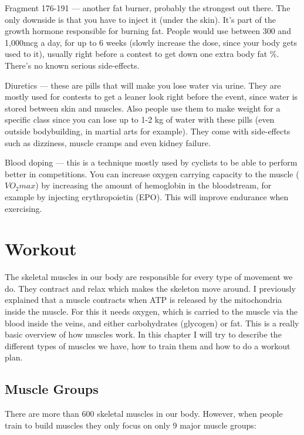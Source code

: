\documentclass[openany, 12pt]{book}
\begin{document}
        Fragment 176-191 --- another fat burner, probably the strongest out there. The only downside is that you have to inject it (under the skin).
        It's part of the growth hormone responsible for burning fat. People would use between 300 and 1,000mcg a day, for up to 6 weeks (slowly increase the dose, since
        your body gets used to it), usually right before a contest to get down one extra body fat \%. There's no known serious side-effects.        

        Diuretics --- these are pills that will make you lose water via urine. They are mostly used for contests to get a leaner look right before the event, since water is
        stored between skin and muscles. Also people use them to make weight for a specific class since you can lose up to 1-2 kg of water with these pills (even outside bodybuilding,
        in martial arts for example). They come with side-effects such as dizziness, muscle cramps and even kidney failure.

        Blood doping --- this is a technique mostly used by cyclists to be able to perform better in competitions. You can increase oxygen carrying capacity to the muscle ($VO_2max$)
        by increasing the amount of hemoglobin in the bloodstream, for example by injecting erythropoietin (EPO). This will improve endurance when exercising.

  \chapter{Workout}

        The skeletal muscles in our body are responsible for every type of movement we do. They contract and relax which makes the skeleton move around. I previously explained that
        a muscle contracts when ATP is released by the mitochondria inside the muscle. For this it needs oxygen, which is carried to the muscle via the blood inside the veins, and
        either carbohydrates (glycogen) or fat. This is a really basic overview of how muscles work. In this chapter I will try to describe the different types of muscles we have,
        how to train them and how to do a workout plan.
  
        \section{Muscle Groups}

        There are more than 600 skeletal muscles in our body. However, when people train to build muscles they only
        focus on only 9 major muscle groups:
\end{document}
